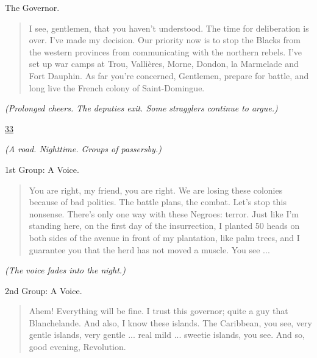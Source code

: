 \documentclass[letterpaper,article,12pt,oneside,notitlepage]{memoir}
\begin{document}
\begin{center}The Governor.\end{center}

\begin{verse}
\indent I see, gentlemen, that you haven't understood. The time for deliberation is over. I've made my decision. Our priority now is to stop the Blacks from the western provinces from communicating with the northern rebels. I've set up war camps at Trou, Vallières, Morne, Dondon, la Marmelade and Fort Dauphin. As far you're concerned, Gentlemen, prepare for battle, and long live the French colony of Saint-Domingue. \\
\end{verse}

\textit{(Prolonged cheers. The deputies exit. Some stragglers continue to argue.)}

\clearpage

\href{http://cesaire.elotroalex.com/chiens/chiens/p033.html}{33}

\textit{(A road. Nighttime. Groups of passersby.)}

\begin{center}1st Group: A Voice.\end{center}

\begin{verse}
\indent You are right, my friend, you are right. We are losing these colonies because of bad politics. The battle plans, the combat. Let's stop this nonsense. There's only one way with these Negroes: terror. Just like I'm standing here, on the first day of the insurrection, I planted 50 heads on both sides of the avenue in front of my plantation, like palm trees, and I guarantee you that the herd has not moved a muscle. You see ... \\
\end{verse}

\textit{(The voice fades into the night.)}

\begin{center}2nd Group: A Voice.\end{center}

\begin{verse}
\indent Ahem! Everything will be fine. I trust this governor; quite a guy that Blanchelande. And also, I know these islands. The Caribbean, you see, very gentle islands, very gentle ... real mild ... sweetie islands, you see. And so, good evening, Revolution. \\
\end{verse}
\end{document}
